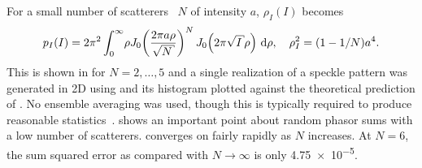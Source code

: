For a small number of scatterers~\cite{jakeman1984speckle} $N$ of intensity
$a$, $\rho_I(I)$ becomes~\cite{goodman2007speckle}
\begin{equation}
p_I(I) = 2\pi^2 \int_0^\infty\! \rho J_0\!\left(\frac{2\pi a
\rho}{\sqrt{N}}\right)^N J_0\!\left(2\pi\sqrt{I}\rho\right)\md\rho,\quad \rho_I^2=(1-1/N)a^4.
\label{eqn:smallscatteqn}
\end{equation}
This is shown in  for $N=2,\ldots,5$ and a single
realization of a speckle pattern was generated in 2D using
 and its histogram plotted against the theoretical
prediction of .  No ensemble averaging was used,
though this is typically required to produce reasonable
statistics~\cite{goodman2007speckle}.   shows an
important point about random phasor sums with a low number of scatterers.
 converges on  fairly rapidly
as $N$ increases.  At $N=6$, the sum squared error as compared with
$N\to\infty$ is only \num{4.75e-5}.

